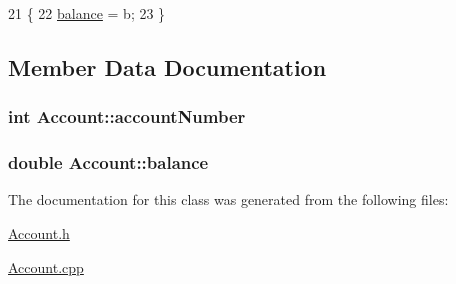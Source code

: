 \begin{DoxyCode}
21                                  \{
22    \hyperlink{classAccount_a6e41f403b4813738ba835377f212de33}{balance} = b;
23 \}
\end{DoxyCode}


\subsection{Member Data Documentation}
\subsubsection[{\texorpdfstring{account\+Number}{accountNumber}}]{\setlength{\rightskip}{0pt plus 5cm}int Account\+::account\+Number\hspace{0.3cm}{\ttfamily [private]}}\hypertarget{classAccount_a92e2552bc9214e93070df37a483fcc1a}{}\label{classAccount_a92e2552bc9214e93070df37a483fcc1a}
\subsubsection[{\texorpdfstring{balance}{balance}}]{\setlength{\rightskip}{0pt plus 5cm}double Account\+::balance\hspace{0.3cm}{\ttfamily [private]}}\hypertarget{classAccount_a6e41f403b4813738ba835377f212de33}{}\label{classAccount_a6e41f403b4813738ba835377f212de33}


The documentation for this class was generated from the following files\+:\begin{DoxyCompactItemize}
\item 
\hyperlink{Account_8h}{Account.\+h}\item 
\hyperlink{Account_8cpp}{Account.\+cpp}\end{DoxyCompactItemize}
